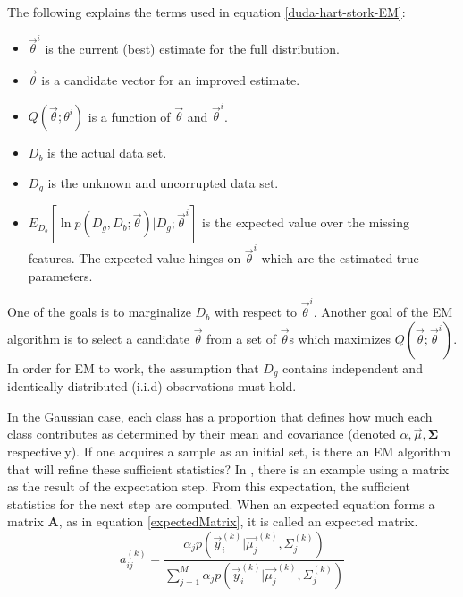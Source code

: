 \documentclass[11pt]{article}
\begin{document}
The following explains the terms used in equation \ref{duda-hart-stork-EM}:
\begin{itemize}
	\item $\vec{\theta}^i$ is the current (best) estimate for the full distribution.  
	\item $\vec{\theta}$ is a candidate vector for an improved estimate.
	\item $Q(\vec{\theta} ; \theta^i)$ is a function of $\vec{\theta}$ and $\vec{\theta}^i$.
	\item $D_b$ is the actual data set.  
	\item $D_g$ is the unknown and uncorrupted data set.
	\item $E_{D_b} [ \ln p(D_g, D_b; \vec{\theta}) | D_g ; \vec{\theta}^i ] $ is the expected value over the missing features.  The expected value hinges on $\vec{\theta}^i$ which are the estimated true parameters.
\end{itemize}
One of the goals is to marginalize $D_b$ with respect to $\vec{\theta}^i$.  Another goal of the EM algorithm is to select a candidate $\vec{\theta}$ from a set of $\vec{\theta}$s which maximizes %
$Q(\vec{\theta} ; \vec{\theta}^i)$.  In order for EM to work, the assumption that $D_g$ contains  independent and identically distributed (i.i.d) observations must hold. 

In the Gaussian case, each class has a proportion that defines how much each class contributes as determined by their mean and covariance (denoted $\alpha, \vec{\mu}, \mathbf{\Sigma}$ respectively).   If one acquires a sample as an initial set, %
 is there an EM algorithm that will refine these sufficient statistics?   %
In \cite{yamazaki98introduction}, there is an example using a matrix as the result of the expectation step.  From this expectation, the sufficient statistics for the next step are %
 computed.   When an expected equation forms a matrix $\mathbf{A}$, as in equation %
\ref{expectedMatrix}, it is called an expected matrix.
\begin{equation}
a_{ij}^{(k)}     = \frac {\alpha_j p(\vec{y}_i  ^{(k)}  | \vec{\mu_j} ^{(k)} , \Sigma_j ^{(k)}  )}{\sum_{j=1}^M \alpha_j p(\vec{y}_i  ^{(k)}  | \vec{\mu_j} ^{(k)} , \Sigma_j ^{(k)}  )} \label{expectedMatrix}
\end{equation}
\end{document}
